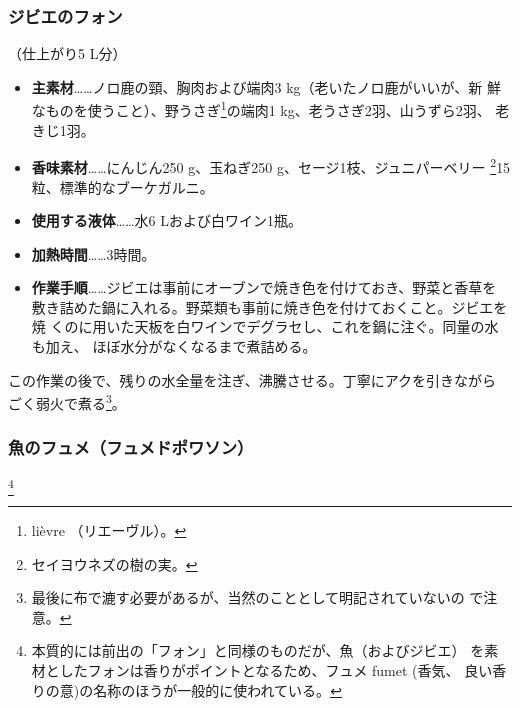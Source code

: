 \begin{recette}
\maeaki

\hypertarget{fonds-de-gibier}{%
\subsubsection{ジビエのフォン}\label{fonds-de-gibier}}



（仕上がり5 L分）

\begin{itemize}
\item
  \textbf{主素材}\ldots{}\ldots{}ノロ鹿の頸、胸肉および端肉3
  kg（老いたノロ鹿がいいが、新 鮮なものを使うこと）、野うさぎ\footnote{lièvre
    （リエーヴル）。}の端肉1 kg、老うさぎ2羽、山うずら2羽、 老きじ1羽。
\item
  \textbf{香味素材}\ldots{}\ldots{}にんじん250 g、玉ねぎ250
  g、セージ1枝、ジュニパーベリー \footnote{セイヨウネズの樹の実。}15粒、標準的なブーケガルニ。
\end{itemize}

\begin{itemize}
\item
  \textbf{使用する液体}\ldots{}\ldots{}水6 Lおよび白ワイン1瓶。
\item
  \textbf{加熱時間}\ldots{}\ldots{}3時間。
\item
  \textbf{作業手順}\ldots{}\ldots{}ジビエは事前にオーブンで焼き色を付けておき、野菜と香草を
  敷き詰めた鍋に入れる。野菜類も事前に焼き色を付けておくこと。ジビエを焼
  くのに用いた天板を白ワインでデグラセし、これを鍋に注ぐ。同量の水も加え、
  ほぼ水分がなくなるまで煮詰める。
\end{itemize}

この作業の後で、残りの水全量を注ぎ、沸騰させる。丁寧にアクを引きながら
ごく弱火で煮る\footnote{最後に布で漉す必要があるが、当然のこととして明記されていないの
  で注意。}。

\maeaki

\hypertarget{fumet-de-poisson}{%
\subsubsection{魚のフュメ（フュメドポワソン）}\label{fumet-de-poisson}}

\footnote{本質的には前出の「フォン」と同様のものだが、魚（およびジビエ）
  を素材としたフォンは香りがポイントとなるため、フュメ fumet (香気、
  良い香りの意)の名称のほうが一般的に使われている。}


\end{recette}
